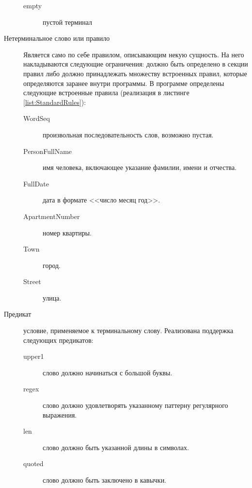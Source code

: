 \begin{description}
\begin{description}
    \item [empty] пустой терминал
  \end{description}
  \item[Нетерминальное слово или правило] Является само по себе правилом, описывающим некую сущность. На него накладываются следующие ограничения: должно быть определено в секции правил либо должно принадлежать множеству встроенных правил, которые определяются заранее внутри программы. В программе определены следующие встроенные правила (реализация в листинге \ref{list:StandardRules}):
  \begin{description}
    \item[WordSeq] произвольная последовательность слов, возможно пустая.
    \item[PersonFullName] имя человека, включающее указание фамилии, имени и отчества.
    \item[FullDate] дата в формате <<число месяц год>>.
    \item[ApartmentNumber] номер квартиры.
    \item[Town] город.
    \item[Street] улица.
  \end{description}
  \item[Предикат] условие, применяемое к терминальному слову. Реализована поддержка следующих предикатов:
  \begin{description}
    \item[upper1] слово должно начинаться с большой буквы.
    \item[regex] слово должно удовлетворять указанному паттерну регулярного выражения.
    \item[len] слово должно быть указанной длины в символах.
    \item[quoted] слово должно быть заключено в кавычки.
  \end{description}
\end{description}


